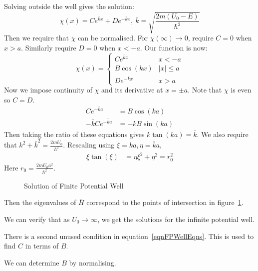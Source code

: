 \documentclass[../Main.tex]{subfiles}
\begin{document}
Solving outside the well gives the solution:
\begin{equation*}
    \chi(x) = Ce^{\bar{k}x} + De^{-\bar{k}x},~\bar{k} = \sqrt{\frac{2m(U_0 - E)}{\hbar^2}} 
\end{equation*}
Then we require that $\chi$ can be normalised. For $\chi(\infty) \to 0$, require $C = 0$ when $x > a$. Similarly require $D = 0$ when $x < -a$. Our function is now:
\begin{equation*}
    \chi(x) =
    \begin{cases}
        Ce^{\bar{k}x} & x < -a \\
        B\cos(kx) & |x| \leq a \\
        De^{-\bar{k}x} & x > a
    \end{cases}
\end{equation*}
Now we impose continuity of $\chi$ and its derivative at $x = \pm a$. Note that $\chi$ is even so $C = D$.
\begin{align}
    Ce^{-\bar{k}a} &= B\cos(ka) \label{eqnFPWellEqns} \\
    -\bar{k} C e^{-\bar{k}a} &= -kB\sin(ka) \nonumber
\end{align}
Then taking the ratio of these equations gives $k\tan(ka) = \bar{k}$. We also require that $k^2 + \bar{k}^2 = \frac{2mU_0}{\hbar^2}$. Rescaling using $\xi = ka, \eta = \bar{k} a$,
\begin{align*}
    \xi \tan(\xi) &= \eta
    \xi^2 + \eta^2 = r_0^2
\end{align*}
Here $r_0 = \frac{2mU_0a^2}{\hbar^2}$.
\begin{figure}
    \centering
    \caption{Solution of Finite Potential Well}
    \label{figFPWellSoln}
\end{figure}
Then the eigenvalues of $\bar{H}$ correspond to the points of intersection in figure~\ref{figFPWellSoln}.

\begin{remarks}
    \item We can verify that as $U_0 \to \infty$, we get the solutions for the infinite potential well.
    \item There is a second unused condition in equation~\ref{eqnFPWellEqns}. This is used to find $C$ in terms of $B$.
    \item We can determine $B$ by normalising.
\end{remarks}
\end{document}
